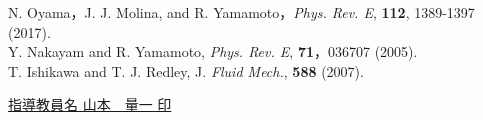 \documentclass[twocolumns,10pt,a4j]{jarticle}
\begin{document}

  \renewcommand{\refname}{\normalsize 参考文献\vspace{-3truemm}}
  \begin{thebibliography}{9}
    N. Oyama，J. J. Molina, and R. Yamamoto，\textit{Phys. Rev. E}, \textbf{112}, 1389-1397 (2017).\\
  \vspace{-7truemm}
    Y. Nakayam and R. Yamamoto, \textit{Phys. Rev. E}, \textbf{71}，036707 (2005).\\
  \vspace{-7truemm}
    T. Ishikawa and T. J. Redley, J. \textit{Fluid Mech.}, \textbf{588} (2007).
  \end{thebibliography}


  \centering
  \underline{指導教員名\hspace{10truemm} 山本　量一 \hspace{20truemm} 印}

\end{document}
